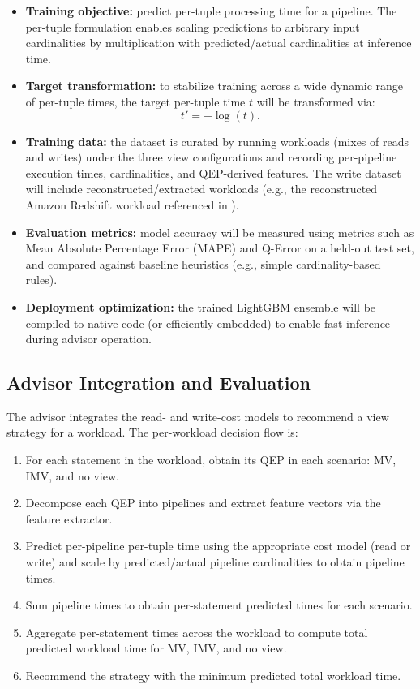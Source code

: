 \begin{itemize}
    \item \textbf{Training objective:} predict per-tuple processing time for a pipeline. The per-tuple formulation enables scaling predictions to arbitrary input cardinalities by multiplication with predicted/actual cardinalities at inference time.
    \item \textbf{Target transformation:} to stabilize training across a wide dynamic range of per-tuple times, the target per-tuple time \(t\) will be transformed via:
    \[
        t' = -\log(t).
    \]
    \item \textbf{Training data:} the dataset is curated by running workloads (mixes of reads and writes) under the three view configurations and recording per-pipeline execution times, cardinalities, and QEP-derived features. The write dataset will include reconstructed/extracted workloads (e.g., the reconstructed Amazon Redshift workload referenced in ).
    \item \textbf{Evaluation metrics:} model accuracy will be measured using metrics such as Mean Absolute Percentage Error (MAPE) and Q-Error on a held-out test set, and compared against baseline heuristics (e.g., simple cardinality-based rules).
    \item \textbf{Deployment optimization:} the trained LightGBM ensemble will be compiled to native code (or efficiently embedded) to enable fast inference during advisor operation.
\end{itemize}

\subsection{Advisor Integration and Evaluation}
\label{sec:integration_evaluation}
The advisor integrates the read- and write-cost models to recommend a view strategy for a workload. The per-workload decision flow is:

\begin{enumerate}
    \item For each statement in the workload, obtain its QEP in each scenario: MV, IMV, and no view.
    \item Decompose each QEP into pipelines and extract feature vectors via the feature extractor.
    \item Predict per-pipeline per-tuple time using the appropriate cost model (read or write) and scale by predicted/actual pipeline cardinalities to obtain pipeline times.
    \item Sum pipeline times to obtain per-statement predicted times for each scenario.
    \item Aggregate per-statement times across the workload to compute total predicted workload time for MV, IMV, and no view.
    \item Recommend the strategy with the minimum predicted total workload time.
\end{enumerate}


